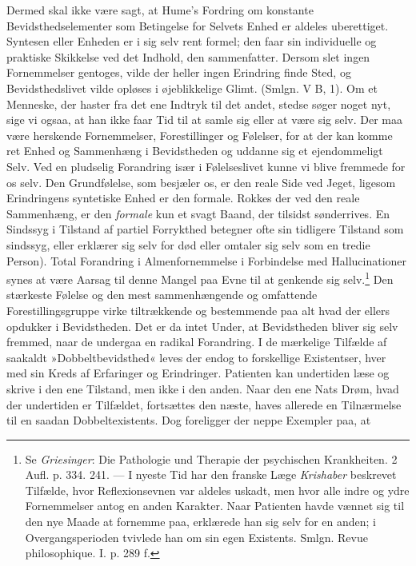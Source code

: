 \documentclass[12pt,a4paper,openany]{book}
\newcommand{\opage}[1]{\marginnote{\footnotesize\textit{[#1]}}}
\begin{document}
Dermed skal ikke være sagt, at Hume’s Fordring om konstante
Bevidsthedselementer som Betingelse for Selvets Enhed er aldeles
uberettiget. Syntesen eller Enheden er i sig selv rent formel; den faar
sin individuelle og praktiske Skikkelse ved det Indhold, den
sammenfatter. Dersom slet ingen Fornemmelser gentoges, vilde der heller
ingen Erindring finde Sted, og Bevidsthedslivet vilde opløses i
øjeblikkelige Glimt. (Smlgn. V B, 1). Om et Menneske, der haster fra det
ene Indtryk til det andet, stedse søger noget nyt, sige vi ogsaa, at han
ikke faar Tid til at samle sig eller at være sig selv. Der maa være
herskende Fornemmelser, Forestillinger og Følelser, for at der kan komme
ret Enhed og Sammenhæng i Bevidstheden og uddanne sig et ejendommeligt
Selv. Ved en pludselig Forandring især i Følelseslivet kunne vi blive
fremmede for os selv. Den Grundfølelse, som besjæler os, er den reale
Side ved Jeget, ligesom Erindringens syntetiske Enhed er den formale.
Rokkes der ved den reale Sammenhæng, er den \emph{formale} kun et svagt
Baand, der tilsidst sønderrives. En Sindssyg i Tilstand af partiel
Forrykthed betegner ofte sin tidligere Tilstand som sindssyg, eller
erklærer sig selv for død eller omtaler sig selv som en tredie Person).
Total Forandring i
\opage{169}Almenfornemmelse i Forbindelse med Hallucinationer synes at
være Aarsag til denne Mangel paa Evne til at genkende sig
selv.\footnote[1]{Se \emph{Griesinger}: Die Pathologie und Therapie der
psychischen Krankheiten. 2 Aufl. p. 334. 241. --- I nyeste Tid har den
franske Læge \emph{Krishaber} beskrevet Tilfælde, hvor Reflexionsevnen
var aldeles uskadt, men hvor alle indre og ydre Fornemmelser antog en
anden Karakter. Naar Patienten havde vænnet sig til den nye Maade at
fornemme paa, erklærede han sig selv for en anden; i Overgangsperioden
tvivlede han om sin egen Existents. Smlgn. Revue philosophique. I. p.
289 f.} Den stærkeste Følelse og den mest sammenhængende og omfattende
Forestillingsgruppe virke tiltrækkende og bestemmende paa alt hvad der
ellers opdukker i Bevidstheden. Det er da intet Under, at Bevidstheden
bliver sig selv fremmed, naar de undergaa en radikal Forandring. I de
mærkelige Tilfælde af saakaldt »Dobbeltbevidsthed« leves der endog to
forskellige Existentser, hver med sin Kreds af Erfaringer og
Erindringer. Patienten kan undertiden læse og skrive i den ene Tilstand,
men ikke i den anden. Naar den ene Nats Drøm, hvad der undertiden er
Tilfældet, fortsættes den næste, haves allerede en Tilnærmelse til en
saadan Dobbeltexistents. Dog foreligger der neppe Exempler paa, at
\end{document}
